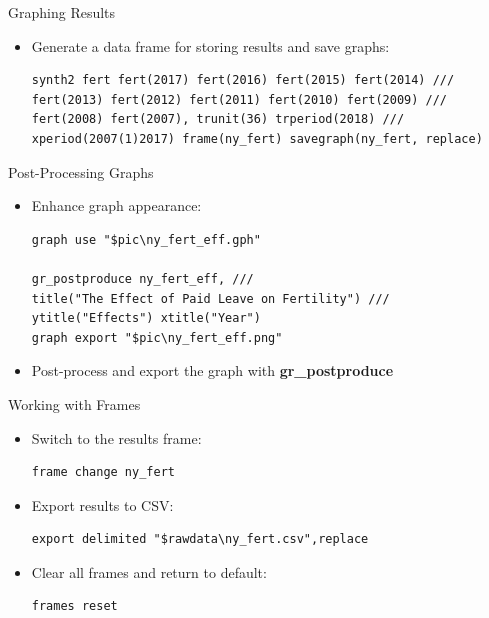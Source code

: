 \documentclass[hyperref={pdfpagelabels=false}]{beamer}
\begin{document}
\begin{frame}[fragile]{Graphing Results}
\begin{itemize}
	\item Generate a data frame for storing results and save graphs:
\begin{lstlisting}
synth2 fert fert(2017) fert(2016) fert(2015) fert(2014) ///
fert(2013) fert(2012) fert(2011) fert(2010) fert(2009) ///
fert(2008) fert(2007), trunit(36) trperiod(2018) ///
xperiod(2007(1)2017) frame(ny_fert) savegraph(ny_fert, replace)
\end{lstlisting}

\end{itemize}
\end{frame}


\begin{frame}[fragile]{Post-Processing Graphs}
\begin{itemize}
	\item Enhance graph appearance:
\vspace{0.2cm}
\begin{lstlisting}
graph use "$pic\ny_fert_eff.gph"

gr_postproduce ny_fert_eff, ///
title("The Effect of Paid Leave on Fertility") ///
ytitle("Effects") xtitle("Year")
graph export "$pic\ny_fert_eff.png"
\end{lstlisting}
\item Post-process and export the graph with \textbf{gr\_postproduce}
\end{itemize}
\end{frame}


\begin{frame}[fragile]{Working with Frames}
\begin{itemize}
	\item Switch to the results frame:
	\vspace{0.2cm}
\begin{lstlisting}
frame change ny_fert
\end{lstlisting}
	\vspace{0.2cm}
	\item Export results to CSV:
	\vspace{0.2cm}
\begin{lstlisting}
export delimited "$rawdata\ny_fert.csv",replace
\end{lstlisting}
	\vspace{0.2cm}
	\item Clear all frames and return to default:
	\vspace{0.2cm}
\begin{lstlisting}
frames reset
\end{lstlisting}
\end{itemize}

\end{frame}
\end{document}
